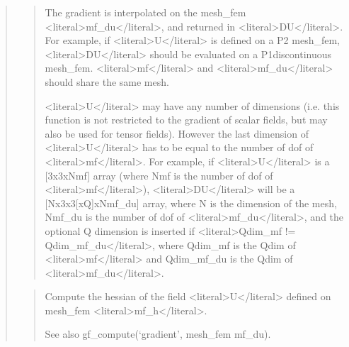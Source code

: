 \documentclass[a4paper,11pt,english]{sphinxmanual}
\begin{document}
\begin{quote}
\begin{quote}
\sphinxAtStartPar
The gradient is interpolated on the mesh\_fem \textless{}literal\textgreater{}mf\_du\textless{}/literal\textgreater{}, and returned in
\textless{}literal\textgreater{}DU\textless{}/literal\textgreater{}. For example, if \textless{}literal\textgreater{}U\textless{}/literal\textgreater{} is defined on a P2 mesh\_fem, \textless{}literal\textgreater{}DU\textless{}/literal\textgreater{} should be
evaluated on a P1\sphinxhyphen{}discontinuous mesh\_fem. \textless{}literal\textgreater{}mf\textless{}/literal\textgreater{} and \textless{}literal\textgreater{}mf\_du\textless{}/literal\textgreater{} should
share the same mesh.

\sphinxAtStartPar
\textless{}literal\textgreater{}U\textless{}/literal\textgreater{} may have any number of dimensions (i.e. this function is not
restricted to the gradient of scalar fields, but may also be used
for tensor fields). However the last dimension of \textless{}literal\textgreater{}U\textless{}/literal\textgreater{} has to be
equal to the number of dof of \textless{}literal\textgreater{}mf\textless{}/literal\textgreater{}. For example, if \textless{}literal\textgreater{}U\textless{}/literal\textgreater{} is a
{[}3x3xNmf{]} array (where Nmf is the number of dof of \textless{}literal\textgreater{}mf\textless{}/literal\textgreater{}), \textless{}literal\textgreater{}DU\textless{}/literal\textgreater{} will
be a {[}Nx3x3{[}xQ{]}xNmf\_du{]} array, where N is the dimension of the mesh,
Nmf\_du is the number of dof of \textless{}literal\textgreater{}mf\_du\textless{}/literal\textgreater{}, and the optional Q dimension
is inserted if \textless{}literal\textgreater{}Qdim\_mf != Qdim\_mf\_du\textless{}/literal\textgreater{}, where Qdim\_mf is the Qdim of
\textless{}literal\textgreater{}mf\textless{}/literal\textgreater{} and Qdim\_mf\_du is the Qdim of \textless{}literal\textgreater{}mf\_du\textless{}/literal\textgreater{}.
\end{quote}

\sphinxAtStartPar
{}
\begin{quote}

\sphinxAtStartPar
Compute the hessian of the field \textless{}literal\textgreater{}U\textless{}/literal\textgreater{} defined on mesh\_fem \textless{}literal\textgreater{}mf\_h\textless{}/literal\textgreater{}.

\sphinxAtStartPar
See also gf\_compute(‘gradient’, mesh\_fem mf\_du).
\end{quote}


\end{quote}
\end{document}

